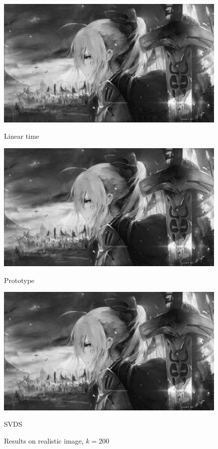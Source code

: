\documentclass{article}
\begin{document}
\begin{figure}[p]
	\begin{minipage}{0.33\linewidth}
		\centering
		\includegraphics[width=1\linewidth]{./fig/image_rec51.jpeg}
		\caption{Linear time}
	\end{minipage}
	\begin{minipage}{0.33\linewidth}
		\centering
		\includegraphics[width=1\linewidth]{./fig/image_rec52.jpeg}
		\caption{Prototype}
	\end{minipage}
    \begin{minipage}{0.33\linewidth}
		\centering
		\includegraphics[width=1\linewidth]{./fig/image_rec53.jpeg}
		\caption{SVDS \label{example22}}
	\end{minipage}
	\caption*{Results on realistic image, $k=200$}
\end{figure} 
\end{document}
